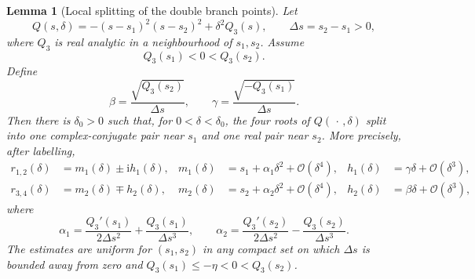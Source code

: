 \documentclass[11pt,a4paper]{article}
\theoremstyle{plain}
\newtheorem{lemma}[theorem]{Lemma}
\theoremstyle{definition}
\theoremstyle{remark}
\newcommand{\ii}{\mathrm{i}}
\newcommand{\Oo}{\mathcal{O}}
\begin{document}
\begin{lemma}[Local splitting of the double branch points]
\label{lem:branch-splitting}
Let
\[
  Q(s,\delta)=-(s-s_1)^2(s-s_2)^2+\delta^2 Q_3(s),
  \qquad
  \Delta s=s_2-s_1>0,
\]
where $Q_3$ is real analytic in a neighbourhood of $s_1,s_2$.
Assume
\[
  Q_3(s_1)<0<Q_3(s_2).
\]
Define
\begin{equation}\label{eq:beta-gamma}
  \beta=\frac{\sqrt{Q_3(s_2)}}{\Delta s},
  \qquad
  \gamma=\frac{\sqrt{-Q_3(s_1)}}{\Delta s}.
\end{equation}
Then there is $\delta_0>0$ such that, for
$0<\delta<\delta_0$, the four roots of $Q(\,\cdot\,,\delta)$
split into one complex-conjugate pair near $s_1$ and one real
pair near $s_2$. More precisely, after labelling,
\begin{align}
  r_{1,2}(\delta)
  &=m_1(\delta)\pm \ii h_1(\delta),
  &
  m_1(\delta)
  &=s_1+\alpha_1\delta^2+\Oo(\delta^4),
  &
  h_1(\delta)
  &=\gamma\delta+\Oo(\delta^3),
  \label{eq:s1-root-splitting}\\
  r_{3,4}(\delta)
  &=m_2(\delta)\mp h_2(\delta),
  &
  m_2(\delta)
  &=s_2+\alpha_2\delta^2+\Oo(\delta^4),
  &
  h_2(\delta)
  &=\beta\delta+\Oo(\delta^3),
  \label{eq:s2-root-splitting}
\end{align}
where
\begin{equation}\label{eq:root-centre-coefficients}
  \alpha_1
  =
  \frac{Q_3'(s_1)}{2\Delta s^2}
  +\frac{Q_3(s_1)}{\Delta s^3},
  \qquad
  \alpha_2
  =
  \frac{Q_3'(s_2)}{2\Delta s^2}
  -\frac{Q_3(s_2)}{\Delta s^3}.
\end{equation}
The estimates are uniform for $(s_1,s_2)$ in any compact set on
which $\Delta s$ is bounded away from zero and
$Q_3(s_1)\le -\eta<0<Q_3(s_2)$.
\end{lemma}
\end{document}
